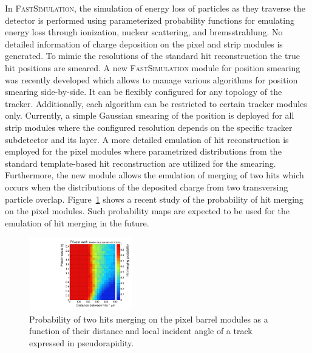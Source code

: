 \documentclass[a4paper]{jpconf}
\begin{document}
In \textsc{FastSimulation}, the simulation of energy loss of particles as they traverse the detector is performed using parameterized probability functions for emulating energy loss through ionization, nuclear scattering, and bremsstrahlung. No detailed information of charge deposition on the pixel and strip modules is generated. To mimic the resolutions of the standard hit reconstruction the true hit positions are smeared. A new \textsc{FastSimulation} module for position smearing was recently developed which allows to manage various algorithms for position smearing side-by-side. It can be flexibly configured for any topology of the tracker. Additionally, each algorithm can be restricted to certain tracker modules only. Currently, a simple Gaussian smearing of the position is deployed for all strip modules where the configured resolution depends on the specific tracker subdetector and its layer. A more detailed emulation of hit reconstruction is employed for the pixel modules where parametrized distributions from the standard template-based hit reconstruction are utilized for the smearing. Furthermore, the new module allows the emulation of merging of two hits which occurs when the distributions of the deposited charge from two transversing particle overlap. Figure~\ref{fig:merge} shows a recent study of the probability of hit merging on the pixel modules. Such probability maps are expected to be used for the emulation of hit merging in the future.

\begin{figure}[htbp]
\begin{center}
\includegraphics[width=0.4\textwidth]{figures/merge.pdf}
\caption{\label{fig:merge}Probability of two hits merging on the pixel barrel modules as a function of their distance and local incident angle of a track expressed in pseudorapidity.}
\end{center}
\end{figure}
\end{document}
